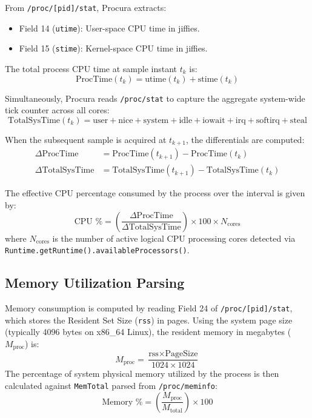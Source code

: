 \documentclass[12pt,a4paper]{article}
\begin{document}
From \texttt{/proc/[pid]/stat}, Procura extracts:
\begin{itemize}
    \item Field 14 (\texttt{utime}): User-space CPU time in jiffies.
    \item Field 15 (\texttt{stime}): Kernel-space CPU time in jiffies.
\end{itemize}
The total process CPU time at sample instant $t_k$ is:
\begin{equation}
\text{ProcTime}(t_k) = \text{utime}(t_k) + \text{stime}(t_k)
\end{equation}

Simultaneously, Procura reads \texttt{/proc/stat} to capture the aggregate system-wide tick counter across all cores:
\begin{equation}
\text{TotalSysTime}(t_k) = \text{user} + \text{nice} + \text{system} + \text{idle} + \text{iowait} + \text{irq} + \text{softirq} + \text{steal}
\end{equation}

When the subsequent sample is acquired at $t_{k+1}$, the differentials are computed:
\begin{align}
\Delta \text{ProcTime} &= \text{ProcTime}(t_{k+1}) - \text{ProcTime}(t_k) \\
\Delta \text{TotalSysTime} &= \text{TotalSysTime}(t_{k+1}) - \text{TotalSysTime}(t_k)
\end{align}

The effective CPU percentage consumed by the process over the interval is given by:
\begin{equation}
\text{CPU \%} = \left( \frac{\Delta \text{ProcTime}}{\Delta \text{TotalSysTime}} \right) \times 100 \times N_{\text{cores}}
\end{equation}
where $N_{\text{cores}}$ is the number of active logical CPU processing cores detected via \texttt{Runtime.getRuntime().availableProcessors()}.

\subsection{Memory Utilization Parsing}
Memory consumption is computed by reading Field 24 of \texttt{/proc/[pid]/stat}, which stores the Resident Set Size (\texttt{rss}) in pages. Using the system page size (typically 4096 bytes on x86\_64 Linux), the resident memory in megabytes ($M_{\text{proc}}$) is:
\begin{equation}
M_{\text{proc}} = \frac{\text{rss} \times \text{PageSize}}{1024 \times 1024}
\end{equation}
The percentage of system physical memory utilized by the process is then calculated against \texttt{MemTotal} parsed from \texttt{/proc/meminfo}:
\begin{equation}
\text{Memory \%} = \left( \frac{M_{\text{proc}}}{M_{\text{total}}} \right) \times 100
\end{equation}
\end{document}
